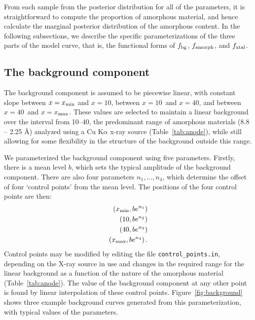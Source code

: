 \documentclass[review]{elsarticle}
\newcommand{\x}{x}
\newcommand{\changed}{\color{blue}}
\begin{document}
From each sample from the posterior distribution for all of the parameters,
it is straightforward to compute the proportion of amorphous material, and hence
calculate the marginal posterior distribution of the amorphous content.
In the following subsections, we describe the specific parameterizations of the
three parts of the model curve, that is, the functional forms of
$f_{\rm bg}$, $f_{\rm amorph}$, and $f_{\rm xtal}$.

\subsection{The background component}
The background component is assumed to be piecewise linear, with constant
slope
{between $\x=\x_{\rm min}$ and $\x=10$\degree, between $\x=10$\degree~and $\x=40$\degree,
and between $\x=40$\degree~and $\x=\x_{\rm max}$}. These values are selected to maintain a linear background over the interval from 10--40\degree, the predominant range of amorphous materials {\changed (8.8 -- 2.25 \AA)} analyzed using a Cu K$\alpha$ x-ray source {\changed (Table~\ref{tab:anode})}, while still allowing for some flexibility in the structure of the background outside this range.

We parameterized the background component using
five parameters. Firstly, there is a mean level $b$, which sets the
typical amplitude of the background component. There are also four parameters
$n_1, ..., n_4$, which determine the offset of four `control points'
from the mean level. The positions of the four control points are then:
\begin{align}
\left(\x_{\rm min}, be^{n_1}\right) \nonumber\\
\left(10, be^{n_2}\right) \nonumber\\
\left(40, be^{n_3}\right) \nonumber\\
\left(\x_{\rm max}, be^{n_4}\right). \nonumber
\end{align}
{\changed Control points may be modified by editing the file {\tt control\_points.in},
depending on the X-ray source in use and changes in the required range for the linear background as a function of the nature of the amorphous material (Table~\ref{tab:anode}).} The value of the background component at any other point is found by
linear interpolation of these control points.
Figure~\ref{fig:background} shows three example
background curves generated from this parameterization, with typical
values of the parameters.
\end{document}
